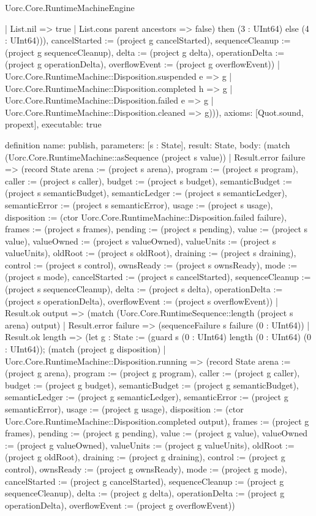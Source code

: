 \begin{lexlean}{Uorc.Core.RuntimeMachineEngine}
\begin{semanticmodule}
{{        | List.nil => true
        | List.cons parent ancestors => false) then (3 : UInt64) else (4 : UInt64))), cancelStarted := (project g cancelStarted), sequenceCleanup := (project g sequenceCleanup), delta := (project g delta), operationDelta := (project g operationDelta), overflowEvent := (project g overflowEvent)})
      | Uorc.Core.RuntimeMachine::Disposition.suspended e => g
      | Uorc.Core.RuntimeMachine::Disposition.completed h => g
      | Uorc.Core.RuntimeMachine::Disposition.failed e => g
      | Uorc.Core.RuntimeMachine::Disposition.cleaned => g))),
  axioms: [Quot.sound, propext],
  executable: true
}

definition{
  name: publish,
  parameters: [s : State],
  result: State,
  body: (match (Uorc.Core.RuntimeMachine::asSequence (project s value))
    | Result.error failure => (record State {arena := (project s arena), program := (project s program), caller := (project s caller), budget := (project s budget), semanticBudget := (project s semanticBudget), semanticLedger := (project s semanticLedger), semanticError := (project s semanticError), usage := (project s usage), disposition := (ctor Uorc.Core.RuntimeMachine::Disposition.failed failure), frames := (project s frames), pending := (project s pending), value := (project s value), valueOwned := (project s valueOwned), valueUnits := (project s valueUnits), oldRoot := (project s oldRoot), draining := (project s draining), control := (project s control), ownsReady := (project s ownsReady), mode := (project s mode), cancelStarted := (project s cancelStarted), sequenceCleanup := (project s sequenceCleanup), delta := (project s delta), operationDelta := (project s operationDelta), overflowEvent := (project s overflowEvent)})
    | Result.ok output => (match (Uorc.Core.RuntimeSequence::length (project s arena) output)
      | Result.error failure => (sequenceFailure s failure (0 : UInt64))
      | Result.ok length => (let g : State := (guard s (0 : UInt64) length (0 : UInt64) (0 : UInt64)); (match (project g disposition)
        | Uorc.Core.RuntimeMachine::Disposition.running => (record State {arena := (project g arena), program := (project g program), caller := (project g caller), budget := (project g budget), semanticBudget := (project g semanticBudget), semanticLedger := (project g semanticLedger), semanticError := (project g semanticError), usage := (project g usage), disposition := (ctor Uorc.Core.RuntimeMachine::Disposition.completed output), frames := (project g frames), pending := (project g pending), value := (project g value), valueOwned := (project g valueOwned), valueUnits := (project g valueUnits), oldRoot := (project g oldRoot), draining := (project g draining), control := (project g control), ownsReady := (project g ownsReady), mode := (project g mode), cancelStarted := (project g cancelStarted), sequenceCleanup := (project g sequenceCleanup), delta := (project g delta), operationDelta := (project g operationDelta), overflowEvent := (project g overflowEvent)})
}
\end{semanticmodule}
\end{lexlean}
